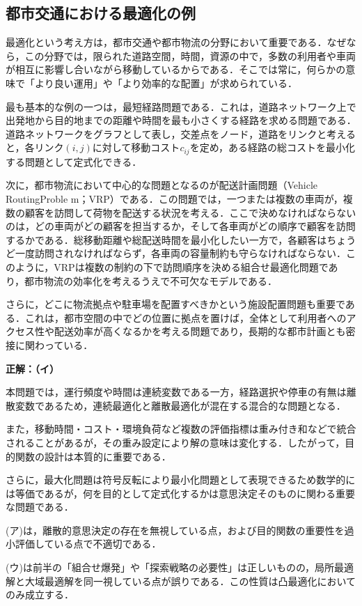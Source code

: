 \subsection{都市交通における最適化の例}

最適化という考え方は，都市交通や都市物流の分野において重要である．なぜなら，この分野では，限られた道路空間，時間，資源の中で，多数の利用者や車両が相互に影響し合いながら移動しているからである．そこでは常に，何らかの意味で「より良い運用」や「より効率的な配置」が求められている．

最も基本的な例の一つは，最短経路問題である．これは，道路ネットワーク上で出発地から目的地までの距離や時間を最も小さくする経路を求める問題である．道路ネットワークをグラフとして表し，交差点をノード，道路をリンクと考えると，各リンク$(i,j)$に対して移動コスト$c_{ij}$を定め，ある経路の総コストを最小化する問題として定式化できる．

次に，都市物流において中心的な問題となるのが配送計画問題（Vehicle RoutingProble m；VRP）である．この問題では，一つまたは複数の車両が，複数の顧客を訪問して荷物を配送する状況を考える．ここで決めなければならないのは，どの車両がどの顧客を担当するか，そして各車両がどの順序で顧客を訪問するかである．総移動距離や総配送時間を最小化したい一方で，各顧客はちょうど一度訪問されなければならず，各車両の容量制約も守らなければならない．このように，VRPは複数の制約の下で訪問順序を決める組合せ最適化問題であり，都市物流の効率化を考えるうえで不可欠なモデルである．

さらに，どこに物流拠点や駐車場を配置すべきかという施設配置問題も重要である．これは，都市空間の中でどの位置に拠点を置けば，全体として利用者へのアクセス性や配送効率が高くなるかを考える問題であり，長期的な都市計画とも密接に関わっている．



\begin{example}[title={クイズ1 正解・解説}]
\label{ans:bus1}
\textbf{正解：（イ）}

本問題では，運行頻度や時間は連続変数である一方，経路選択や停車の有無は離散変数であるため，連続最適化と離散最適化が混在する混合的な問題となる．

また，移動時間・コスト・環境負荷など複数の評価指標は重み付き和などで統合されることがあるが，その重み設定により解の意味は変化する．したがって，目的関数の設計は本質的に重要である．

さらに，最大化問題は符号反転により最小化問題として表現できるため数学的には等価であるが，何を目的として定式化するかは意思決定そのものに関わる重要な問題である．

(ア)は，離散的意思決定の存在を無視している点，および目的関数の重要性を過小評価している点で不適切である．  

(ウ)は前半の「組合せ爆発」や「探索戦略の必要性」は正しいものの，局所最適解と大域最適解を同一視している点が誤りである．この性質は凸最適化においてのみ成立する．

\end{example}

